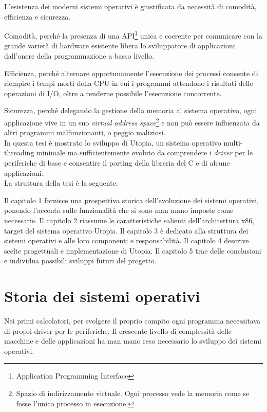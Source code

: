 \documentclass[12pt,a4paper]{report}
\begin{document}
	L'esistenza dei moderni sistemi operativi è giustificata da necessità di comodità, efficienza e sicurezza.
	
	Comodità, perché la presenza di una API\footnote{Application Programming Interface} unica e coerente per comunicare con
	la grande varietà di hardware esistente libera lo sviluppatore di applicazioni dall'onere della programmazione a basso livello.
	
	Efficienza, perché alternare opportunamente l'esecuzione dei processi consente di riempire i tempi morti della CPU in cui
	i programmi attendono i risultati delle operazioni di I/O, oltre a renderne possibile l'esecuzione concorrente.
	
	Sicurezza, perché delegando la gestione della memoria al sistema operativo, ogni applicazione vive in un suo
	\emph{virtual address space}\footnote{Spazio di indirizzamento virtuale. Ogni processo vede la memoria come se fosse
	l'unico processo in esecuzione.} e non può essere influenzata da altri programmi malfunzionanti, o peggio maliziosi. \\
	
	In questa tesi è mostrato lo sviluppo di Utopia, un sistema operativo multi-threading minimale ma sufficientemente evoluto
	da comprendere i \emph{driver} per le periferiche di base e consentire il porting della libreria del C e di alcune applicazioni. \\
	
	La struttura della tesi è la seguente:
	
	Il capitolo 1 fornisce una prospettiva storica dell'evoluzione dei sistemi operativi, ponendo l'accento sulle funzionalità
	che si sono man mano imposte come necessarie. Il capitolo 2 riassume le caratteristiche salienti dell'architettura x86,
	target del sistema operativo Utopia. Il capitolo 3 è dedicato alla struttura dei sistemi operativi e alle loro
	componenti e responsabilità. Il capitolo 4 descrive scelte progettuali e implementazione di Utopia.
	Il capitolo 5 trae delle conclusioni e individua possibili sviluppi futuri del progetto.


\chapter{Storia dei sistemi operativi}
	Nei primi calcolatori, per svolgere il proprio compito ogni programma necessitava di propri driver per le periferiche.
	Il crescente livello di complessità delle macchine e delle applicazioni ha man mano reso necessario lo sviluppo dei sistemi operativi.
	
\end{document}
